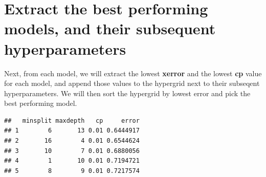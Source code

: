 \documentclass[]{article}
\newenvironment{Shaded}{\begin{snugshade}}{\end{snugshade}}
\newcommand{\KeywordTok}[1]{\textcolor[rgb]{0.13,0.29,0.53}{\textbf{#1}}}
\newcommand{\DataTypeTok}[1]{\textcolor[rgb]{0.13,0.29,0.53}{#1}}
\newcommand{\DecValTok}[1]{\textcolor[rgb]{0.00,0.00,0.81}{#1}}
\newcommand{\StringTok}[1]{\textcolor[rgb]{0.31,0.60,0.02}{#1}}
\newcommand{\CommentTok}[1]{\textcolor[rgb]{0.56,0.35,0.01}{\textit{#1}}}
\newcommand{\ControlFlowTok}[1]{\textcolor[rgb]{0.13,0.29,0.53}{\textbf{#1}}}
\newcommand{\OperatorTok}[1]{\textcolor[rgb]{0.81,0.36,0.00}{\textbf{#1}}}
\newcommand{\NormalTok}[1]{#1}
\begin{document}
\section{Extract the best performing models, and their subsequent
hyperparameters}\label{extract-the-best-performing-models-and-their-subsequent-hyperparameters}

Next, from each model, we will extract the lowest \textbf{xerror} and
the lowest \textbf{cp} value for each model, and append those values to
the hypergrid next to their subseqent hyperparameters. We will then sort
the hypergrid by lowest error and pick the best performing model.

\begin{Shaded}
\end{Shaded}

\begin{verbatim}
##   minsplit maxdepth   cp     error
## 1        6       13 0.01 0.6444917
## 2       16        4 0.01 0.6544624
## 3       10        7 0.01 0.6880056
## 4        1       10 0.01 0.7194721
## 5        8        9 0.01 0.7217574
\end{verbatim}
\end{document}
